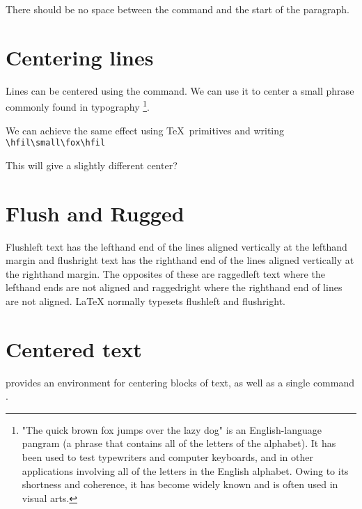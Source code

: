 There should be no space between the  command and
the start of the paragraph. 


\section{Centering lines}

Lines can be centered using the  command. We can use it to center a small phrase commonly found
in typography \footnote{"The quick brown fox jumps over the lazy dog" is an English-language pangram (a phrase that contains all of the letters of the alphabet). It has been used to test typewriters and computer keyboards, and in other applications involving all of the letters in the English alphabet. Owing to its shortness and coherence, it has become widely known and is often used in visual arts.}.

\noindent\centerline{\small\fox}

We can achieve the same effect using \TeX\  primitives  and writing \verb+\hfil\small\fox\hfil+
\medskip

{\hfil\small\fox\hfil}


This will give a slightly different center?

\section{Flush and Rugged}

Flushleft text has the lefthand end of the lines aligned vertically at the lefthand margin
and flushright text has the righthand end of the lines aligned vertically at the righthand
margin. The opposites of these are raggedleft text where the lefthand ends are not aligned
and raggedright where the righthand end of lines are not aligned. LaTeX normally typesets
flushleft and flushright.

\topline

{\small \begin{flushleft} \lorem \end{flushleft}}

{\small \begin{flushright} \lorem \end{flushright}}

\bottomline

\section{Centered text}
\latex provides an environment for centering blocks of text, as well as a single command . 

